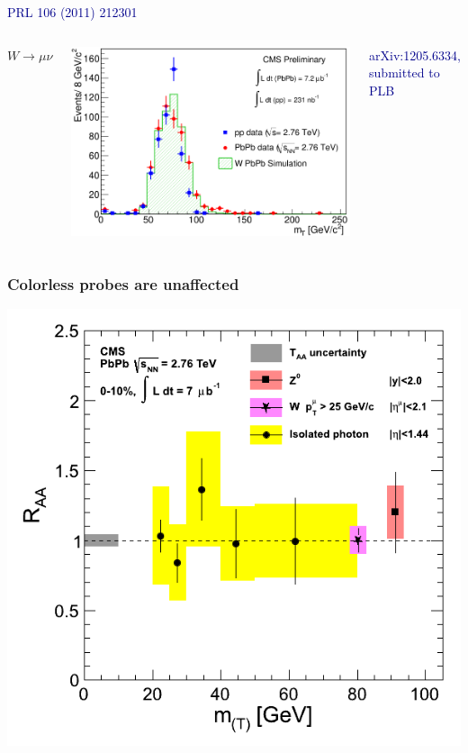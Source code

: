 \documentclass[compress]{beamer}
\begin{document}
\begin{frame}
\begin{columns}
\centering \textcolor{darkblue}{\scriptsize PRL 106 (2011) 212301}
\end{columns}

\begin{columns}
\centering $W \to \mu \nu$

\includegraphics[width=0.5\linewidth]{dimuons/w_mass.png}

\centering \textcolor{darkblue}{\scriptsize arXiv:1205.6334, submitted to PLB}
\end{columns}
\end{frame}

\begin{frame}
\frametitle{Colorless probes are unaffected}
\begin{center}
\includegraphics[width=0.8\linewidth]{dimuons/RAAs-Boson-8.png}
\end{center}
\end{frame}

\end{document}
